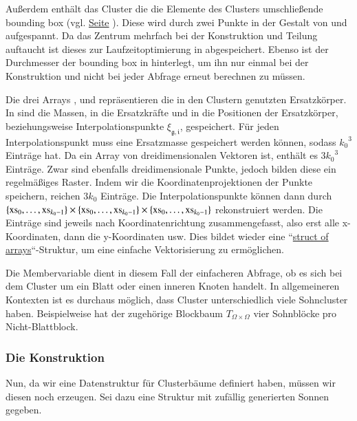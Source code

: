     Außerdem enthält das Cluster die die Elemente des Clusters umschließende bounding box (vgl. \hyperref[w:bbox]{Seite} \pageref{w:bbox}). Diese wird durch zwei Punkte in der Gestalt 
    von  und  aufgespannt. 
    Da das Zentrum mehrfach bei der Konstruktion und Teilung auftaucht ist dieses zur Laufzeitoptimierung in  abgespeichert.
    Ebenso ist der Durchmesser der bounding box in  hinterlegt, um ihn nur einmal bei der Konstruktion und nicht bei jeder Abfrage erneut berechnen zu müssen.
    
    Die drei Arrays ,  und  repräsentieren die in den Clustern genutzten Ersatzkörper. In  sind die  Massen, in  
    die Ersatzkräfte und in  die Positionen der Ersatzkörper, beziehungsweise Interpolationspunkte $\xi_{\mathfrak{g}, \mathfrak{i}}$, gespeichert. Für jeden Interpolationspunkt muss
    eine Ersatzmasse gespeichert werden können, sodass  ${k_0}^3$ Einträge hat.
    Da  ein Array von dreidimensionalen Vektoren ist, enthält es $3 {k_0}^3$ Einträge. Zwar sind  ebenfalls dreidimensionale Punkte, jedoch bilden diese ein regelmäßiges Raster. Indem
    wir die Koordinatenprojektionen der Punkte speichern, reichen $3 k_0$ Einträge. Die Interpolationspunkte können dann durch 
    $\{\tcode{xs}_0, \dots ,\tcode{xs}_{k_0-1}\} \times \{\tcode{xs}_0, \dots ,\tcode{xs}_{k_0-1}\} \times \{\tcode{xs}_0, \dots ,\tcode{xs}_{k_0-1}\}$ rekonstruiert werden.
    Die Einträge sind jeweils nach Koordinatenrichtung zusammengefasst, also erst alle x-Koordinaten, dann die y-Koordinaten usw. Dies bildet wieder eine 
    ``\hyperref[w:aos]{struct of arrays}``-Struktur, um eine einfache Vektorisierung zu ermöglichen.
    
    Die Membervariable  dient in diesem Fall der einfacheren Abfrage, ob es sich bei dem Cluster um ein Blatt oder einen inneren Knoten handelt. In allgemeineren Kontexten 
    ist es durchaus möglich, dass Cluster unterschiedlich viele Sohncluster haben. Beispielweise hat der zugehörige Blockbaum $T_{\Omega \times \Omega}$ vier Sohnblöcke pro Nicht-Blattblock. 
    
    \subsubsection{Die Konstruktion}
    \label{sec:konstr}
    
    Nun, da wir eine Datenstruktur für Clusterbäume definiert haben, müssen wir diesen noch erzeugen. Sei dazu eine  Struktur mit zufällig generierten Sonnen gegeben.
    
